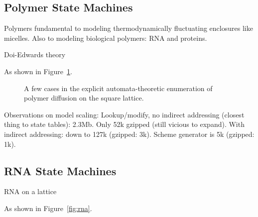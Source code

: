 \documentclass{acm_proc_article-sp}
\begin{document}
\subsection{Polymer State Machines}

Polymers fundamental to modeling thermodynamically fluctuating enclosures like micelles.
Also to modeling biological polymers: RNA and proteins.

Doi-Edwards theory \cite{DoiEdwards1988}

As shown in Figure~\ref{fig:polymer}.

\begin{figure}
\caption{
\label{fig:polymer}
A few cases in the explicit automata-theoretic enumeration of polymer diffusion on the square lattice.
}
\end{figure}

Observations on model scaling:
Lookup/modify, no indirect addressing (closest thing to state tables): 2.3Mb.
Only 52k gzipped (still vicious to expand).
With indirect addressing: down to 127k (gzipped: 3k).
Scheme generator is 5k (gzipped: 1k).


\subsection{RNA State Machines}

RNA on a lattice \cite{LeoniVanderzande2003,JostEveraers2010,ZaraPretti2007,GillespieMayneJiang2009}


As shown in Figure~\ref{fig:rna}.
\end{document}
